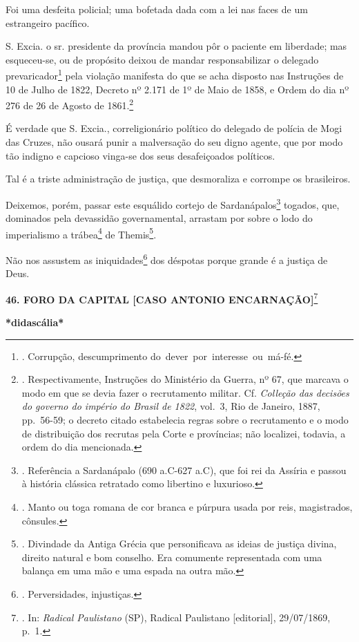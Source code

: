 Foi uma desfeita policial; uma bofetada dada com a lei nas faces de um
estrangeiro pacífico.

S. Excia. o sr. presidente da província mandou pôr o paciente em
liberdade; mas esqueceu-se, ou de propósito deixou de mandar
responsabilizar o delegado prevaricador\footnote{. Corrupção,
  descumprimento do~dever~por~interesse~ou~má-fé.} pela violação
manifesta do que se acha disposto nas Instruções de 10 de Julho de 1822,
Decreto nº 2.171 de 1º de Maio de 1858, e Ordem do dia nº 276 de 26 de
Agosto de 1861.\footnote{. Respectivamente, Instruções do Ministério da
  Guerra, nº 67, que marcava o modo em que se devia fazer o recrutamento
  militar. Cf. \emph{Colleção das decisões do governo do império do
  Brasil de 1822}, vol.~3, Rio de Janeiro, 1887, pp.~56-59; o decreto
  citado estabelecia regras sobre o recrutamento e o modo de
  distribuição dos recrutas pela Corte e províncias; não localizei,
  todavia, a ordem do dia mencionada.}

É verdade que S. Excia., correligionário político do delegado de polícia
de Mogi das Cruzes, não ousará punir a malversação do seu digno agente,
que por modo tão indigno e capcioso vinga-se dos seus desafeiçoados
políticos.

Tal é a triste administração de justiça, que desmoraliza e corrompe os
brasileiros.

Deixemos, porém, passar este esquálido cortejo de
Sardanápalos\footnote{. Referência a Sardanápalo (690 a.C-627 a.C), que
  foi rei da Assíria e passou à história clássica retratado como
  libertino e luxurioso.} togados, que, dominados pela devassidão
governamental, arrastam por sobre o lodo do imperialismo a
trábea\footnote{. Manto ou toga romana de cor branca e púrpura usada por
  reis, magistrados, cônsules.} de Themis\footnote{. Divindade da Antiga
  Grécia que personificava as ideias de justiça divina, direito natural
  e bom conselho. Era comumente representada com uma balança em uma mão
  e uma espada na outra mão.}.

Não nos assustem as iniquidades\footnote{. Perversidades, injustiças.}
dos déspotas porque grande é a justiça de Deus.

\textbf{46. FORO DA CAPITAL {[}CASO ANTONIO ENCARNAÇÃO{]}}\footnote{.
  In: \emph{Radical Paulistano} (SP), Radical Paulistano
  {[}editorial{]}, 29/07/1869, p.~1.}

\textbf{*didascália*}

